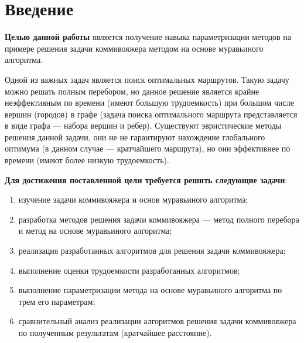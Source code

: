 \chapter*{Введение}
\textbf{Целью данной работы} является получение навыка параметризации методов на примере решения задачи коммивояжера методом на основе муравьиного алгоритма.

Одной из важных задач является поиск оптимальных маршрутов. Такую задачу можно решать полным перебором, но данное решение является крайне неэффективным по времени (имеют большую трудоемкость) при большом числе вершин (городов) в графе (задача поиска оптимального маршрута представляется в виде графа --- набора вершин и ребер). Существуют эвристические методы решения данной задачи, они не не гарантируют нахождение глобального оптимума (в данном случае --- кратчайшего маршрута), но они эффективнее по времени (имеют более низкую трудоемкость). 

\textbf{Для достижения поставленной цели требуется решить следующие задачи}:
\begin{enumerate}[label={\arabic*)}]
        \item изучение задачи коммивояжера и основ муравьиного алгоритма;
	\item разработка методов решения задачи коммивояжера --- метод полного перебора и метод на основе муравьиного алгоритма;
        \item реализация разработанных алгоритмов для решения задачи коммивояжера;
	\item выполнение оценки трудоемкости разработанных алгоритмов;
        \item выполнение параметризации метода на основе муравьиного алгоритма по трем его параметрам;
        \item сравнительный анализ реализации алгоритмов решения задачи коммивояжера по полученным результатам (кратчайшее расстояние).
\end{enumerate}